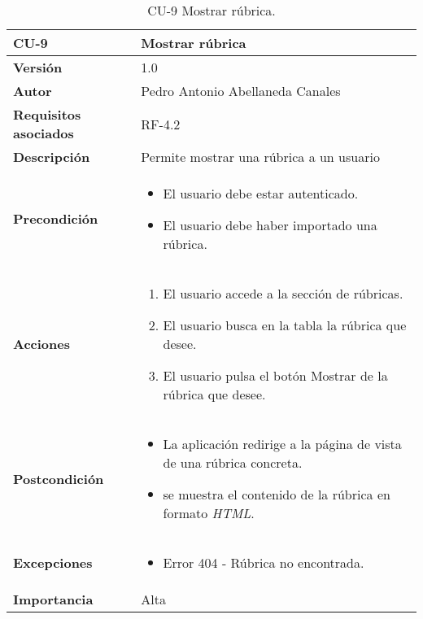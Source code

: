 \begin{table}[p]
	\centering
	\begin{tabularx}{\linewidth}{ p{} p{} }
		\toprule
		\textbf{CU-9}    & \textbf{Mostrar rúbrica} \\
		\midrule
		\textbf{Versión}              & 1.0    \\
		\textbf{Autor}                & Pedro Antonio Abellaneda Canales \\
		\textbf{Requisitos asociados} & RF-4.2 \\
		\textbf{Descripción}          & Permite mostrar una rúbrica a un usuario \\
		\textbf{Precondición}         & \begin{itemize}
                                        \tightlist
		                                  \item El usuario debe estar autenticado.
		                                  \item El usuario debe haber importado una rúbrica.
		                                 \end{itemize} \\
		\textbf{Acciones}             &
		\begin{enumerate}
			\def\labelenumi{\arabic{enumi}.}
			\tightlist
			\item El usuario accede a la sección de rúbricas.
            \item El usuario busca en la tabla la rúbrica que desee.
			\item El usuario pulsa el botón Mostrar de la rúbrica que desee.
		\end{enumerate} \\
		\textbf{Postcondición}        & \begin{itemize}
                                        \tightlist
		                                  \item La aplicación redirige a la página de vista de una rúbrica concreta. 
                                          \item se muestra el contenido de la rúbrica en formato \textit{HTML}.
		                                 \end{itemize} \\
		\textbf{Excepciones}          & \begin{itemize}
                                        \tightlist
		                                  \item Error 404 - Rúbrica no encontrada.
		                                 \end{itemize} \\
		\textbf{Importancia}          & Alta \\
		\bottomrule
	\end{tabularx}
	\caption{CU-9 Mostrar rúbrica.}
	\label{tab:CU-9}
\end{table}

